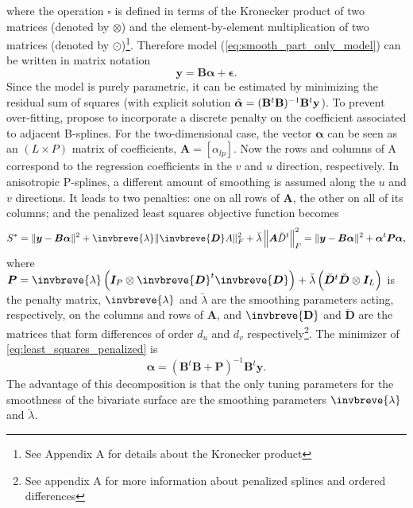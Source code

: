 where the operation $\square$ is defined in terms of the Kronecker product of two matrices (denoted by $\otimes$) and the element-by-element multiplication of two matrices (denoted by $\odot$)\footnote{See Appendix A for details about the Kronecker product}. Therefore model (\ref{eq:smooth_part_only_model}) can be written in matrix notation
\begin{equation}
    \boldsymbol{y} = \boldsymbol{B}\boldsymbol{\alpha} + \boldsymbol{\epsilon}
    \text{.}
    \label{eq:spline_model_mat_form}
\end{equation}
Since the model is purely parametric, it can be estimated by minimizing the residual sum of squares (with explicit solution $\Hat{\boldsymbol{\alpha}} = (\mathbf{B}^t\mathbf{B})^{-1}\mathbf{B}^t\mathbf{y}$). To prevent over-fitting, \textcite{eilers_flexible_1996} propose to incorporate a discrete penalty on the coefficient associated to adjacent B-splines. For the two-dimensional case, the vector $\boldsymbol{\alpha}$ can be seen as an  $(L \times P)$  matrix  of  coefficients, $\mathbf{A}=[\alpha_{lp}]$. Now the rows  and columns of A correspond to the regression coefficients in the $v$ and  $u$ direction, respectively. In anisotropic P-splines, a different amount of smoothing is assumed along the $u$ and $v$ directions. It leads to two penalties:  one on all rows of $\mathbf{A}$,  the other on all of its columns; and the penalized least squares objective function becomes \parencite{eilers_multivariate_2003}
\begin{equation}
    S^{*}=\|\boldsymbol{y}-\boldsymbol{B} \boldsymbol{\alpha}\|^{2}+\invbreve{\lambda}\|\invbreve{\boldsymbol{D}} A\|_{F}^{2}+\breve{\lambda}\left\|\boldsymbol{A} \breve{D}^{t}\right\|_{F}^{2}=\|\boldsymbol{y}-\boldsymbol{B} \boldsymbol{\alpha}\|^{2}+\boldsymbol{\alpha}^{t} \boldsymbol{P} \boldsymbol{\alpha}
    \text{,}
    \label{eq:least_squares_penalized}
\end{equation}
where $\boldsymbol{P}=\invbreve{\lambda}\left(\boldsymbol{I}_{P} \otimes \invbreve{\boldsymbol{D}}^{t} \invbreve{\boldsymbol{D}}\right)+\breve{\lambda}\left(\breve{\boldsymbol{D}}^{t} \breve{\boldsymbol{D}} \otimes \boldsymbol{I}_{L}\right)$ is the penalty matrix, $\invbreve{\lambda}$ and $\breve{\lambda}$ are the smoothing parameters acting, respectively, on the columns and rows of $\mathbf{A}$, and $\invbreve{\mathbf{D}}$ and $\breve{\mathbf{D}}$ are the matrices that form differences of order $d_u$ and $d_v$ respectively\footnote{See appendix A for more information about penalized splines and ordered differences}. The minimizer of \ref{eq:least_squares_penalized} is 
\begin{equation}
    \widehat{\boldsymbol{\alpha}}=\left(\boldsymbol{B}^{t} \boldsymbol{B}+\boldsymbol{P}\right)^{-1} \boldsymbol{B}^{t} \boldsymbol{y}
    \text{.}
\end{equation}
The advantage of this decomposition is that the only tuning parameters for the smoothness of the bivariate surface are the smoothing parameters $\invbreve{\lambda}$ and $\breve{\lambda}$.

